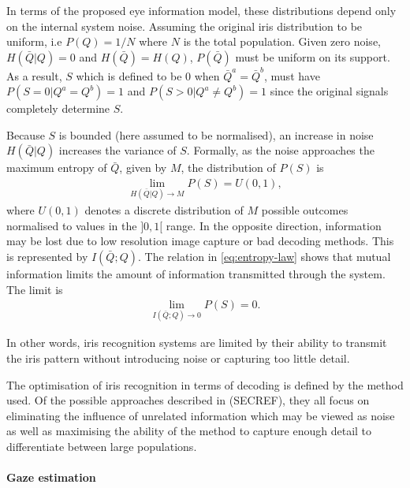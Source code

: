 In terms of the proposed eye information model, these distributions depend only on the internal system noise. Assuming the original iris distribution to be uniform, i.e $P(Q)=1/N$ where $N$ is the total population. Given zero noise, $H(\bar{Q}|Q)=0$ and $H(\bar{Q})=H(Q)$, $P(\bar{Q})$ must be uniform on its support. As a result, $S$ which is defined to be $0$ when $\bar{Q}^a = \bar{Q}^b$, must have $P(S=0|Q^a = Q^b)=1$ and $P(S>0|Q^a \neq Q^b)=1$ since the original signals completely determine $S$. 

Because $S$ is bounded (here assumed to be normalised), an increase in noise $H(\bar{Q}|Q)$ increases the variance of $S$. Formally, as the noise approaches the maximum entropy of $\bar{Q}$, given by $M$, the distribution of $P(S)$ is
\begin{align}
\lim_{H(\bar{Q}|Q)\rightarrow M} P(S) = U(0, 1),
\end{align}
where $U(0, 1)$ denotes a discrete distribution of $M$ possible outcomes normalised to values in the $]0, 1[$ range. In the opposite direction, information may be lost due to low resolution image capture or bad decoding methods. This is represented by $I(\bar{Q};Q)$. The relation in \autoref{eq:entropy-law} shows that mutual information limits the amount of information transmitted through the system. The limit is
\begin{align}
\lim_{I(\bar{Q};Q)\rightarrow 0} P(S) = 0.
\end{align}

In other words, iris recognition systems are limited by their ability to transmit the iris pattern without introducing noise or capturing too little detail.

The optimisation of iris recognition in terms of decoding is defined by the method used. Of the possible approaches described in (SECREF), they all focus on eliminating the influence of unrelated information which may be viewed as noise as well as maximising the ability of the method to capture enough detail to differentiate between large populations. 

\paragraph{Gaze estimation}

